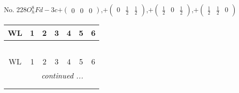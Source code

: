 \documentclass[fleqn,9pt,landscape]{jsarticle}
\begin{document}
\newpage
No. 228\quad$O_{h}^{8}$\quad$Fd-3c$\quad[ cubic ]\quad$+\begin{pmatrix} 0 & 0 & 0 \end{pmatrix}$,\quad $+\begin{pmatrix} 0 & \frac{1}{2} & \frac{1}{2} \end{pmatrix}$,\quad $+\begin{pmatrix} \frac{1}{2} & 0 & \frac{1}{2} \end{pmatrix}$,\quad $+\begin{pmatrix} \frac{1}{2} & \frac{1}{2} & 0 \end{pmatrix}$
\begin{center}
\renewcommand{\arraystretch}{1.2}
\begin{longtable}{ccccccc}
 \hline \hline
WL & 1 & 2 & 3 & 4 & 5 & 6 \\ \hline \endfirsthead

\multicolumn{6}{l}{\tablename\ \thetable{}} \\
 \hline \hline
WL & 1 & 2 & 3 & 4 & 5 & 6 \\ \hline \endhead

 \hline \hline
\multicolumn{6}{r}{\footnotesize\it continued ...} \\ \endfoot

 \hline \hline
\multicolumn{6}{r}{} \\ \endlastfoot


\end{longtable}
\end{center}
\end{document}
